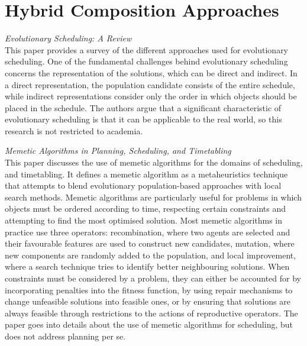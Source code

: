 \section{Hybrid Composition Approaches}
\textit{Evolutionary Scheduling: A Review \cite{hart2005evolutionary}}\\
This paper provides a survey of the different approaches used for evolutionary scheduling. One of the fundamental challenges behind evolutionary scheduling
concerns the representation of the solutions, which can be direct and indirect. In a direct representation, the population candidate consists of the entire
schedule, while indirect representations consider only the order in which objects should be placed in the schedule. The authors argue that a significant
characteristic of evolutionary scheduling is that it can be applicable to the real world, so this research is not restricted to academia.

\textit{Memetic Algorithms in Planning, Scheduling, and Timetabling \cite{cotta2007memetic}}\\
This paper discusses the use of memetic algorithms for the domains of scheduling, and timetabling. It defines a memetic algorithm as a metaheuristics technique that 
attempts to blend evolutionary population-based approaches with local search methods. Memetic algorithms are particularly useful for problems in which objects must
be ordered according to time, respecting certain constraints and attempting to find the most optimised solution. Most memetic algorithms in practice use three
operators: recombination, where two agents are selected and their favourable features are used to construct new candidates, mutation, where new components are randomly
added to the population, and local improvement, where a search technique tries to identify better neighbouring solutions. When constraints must be considered by
a problem, they can either be accounted for by incorporating penalties into the fitness function, by using repair mechanisms to change unfeasible solutions into
feasible ones, or by ensuring that solutions are always feasible through restrictions to the actions of reproductive operators. The paper goes into details about
the use of memetic algorithms for scheduling, but does not address planning per se.

